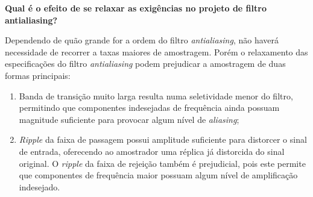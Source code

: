 \textbf{Qual é o efeito de se relaxar as exigências no projeto de filtro antialiasing?}

Dependendo de quão grande for a ordem do filtro \textit{antialiasing}, não haverá necessidade de recorrer a taxas maiores de amostragem. Porém o relaxamento das especificações do filtro \textit{antialiasing} podem prejudicar a amostragem de duas formas principais:

\begin{enumerate}
    \item Banda de transição muito larga resulta numa seletividade menor do filtro, permitindo que componentes indesejadas de frequência ainda possuam magnitude suficiente para provocar algum nível de \textit{aliasing};
    \item \textit{Ripple} da faixa de passagem possui amplitude suficiente para distorcer o sinal de entrada, oferecendo ao amostrador uma réplica já distorcida do sinal original. O \textit{ripple} da faixa de rejeição também é prejudicial, pois este permite que componentes de frequência maior possuam algum nível de amplificação indesejado. 
\end{enumerate}
